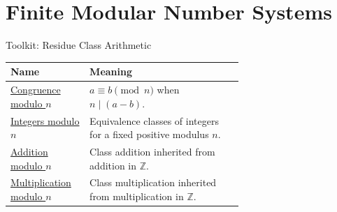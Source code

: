 \section{Finite Modular Number Systems}
\begin{toolkitbox}{Toolkit: Residue Class Arithmetic}
\small
\renewcommand{\arraystretch}{1.35}
\begin{tabular}{@{} l p{0.66\linewidth} @{}}
\toprule
\textbf{Name} & \textbf{Meaning} \\
\midrule
\hyperref[def:congruence-modulo-integer]{Congruence modulo \(n\)}
  & \(a\equiv b\pmod n\) when \(n\mid(a-b)\). \\
\hyperref[def:integers-modulo-n]{Integers modulo \(n\)}
  & Equivalence classes of integers for a fixed positive modulus \(n\). \\
\hyperref[def:addition-modulo-n]{Addition modulo \(n\)}
  & Class addition inherited from addition in \(\mathbb{Z}\). \\
\hyperref[def:multiplication-modulo-n]{Multiplication modulo \(n\)}
  & Class multiplication inherited from multiplication in \(\mathbb{Z}\). \\
\bottomrule
\end{tabular}
\end{toolkitbox}


